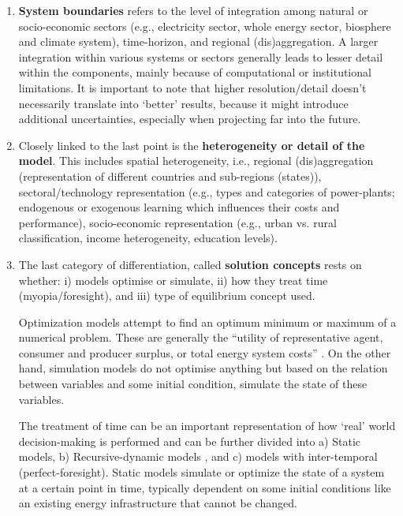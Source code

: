\documentclass[../thesis.tex]{subfiles}
\begin{document}
\begin{enumerate}
\item \textbf{System boundaries} refers to the level of integration among natural or socio-economic sectors (e.g., electricity sector, whole energy sector, biosphere and climate system), time-horizon, and regional (dis)aggregation. A larger integration within various systems or sectors generally leads to lesser detail within the components, mainly because of computational or institutional limitations. It is important to note that higher resolution/detail doesn't necessarily translate into `better' results, because it might introduce additional uncertainties, especially when projecting far into the future.
\item Closely linked to the last point is the \textbf{ heterogeneity or detail of the model}. This includes spatial heterogeneity, i.e., regional (dis)aggregation (representation of different countries and sub-regions (states)), sectoral/technology representation (e.g., types and categories of power-plants; endogenous or exogenous learning which influences their costs and performance), socio-economic representation (e.g., urban vs. rural classification, income heterogeneity, education levels). 
\item The last category of differentiation, called \textbf{solution concepts} rests on whether: i) models optimise or simulate, ii) how they treat time (myopia/foresight), and iii) type of equilibrium concept used. 

Optimization models attempt to find an optimum minimum or maximum of a numerical problem. These are generally the ``utility of representative agent, consumer and producer surplus, or total energy system costs'' \citep{krey2014}. On the other hand, simulation models do not optimise anything but based on the relation between variables and some initial condition, simulate the state of these variables.

The treatment of time can be an important representation of how `real' world decision-making is performed and can be further divided into a) Static models, b) Recursive-dynamic models , and c) models with inter-temporal (perfect-foresight). Static models simulate or optimize the state of a system at a certain point in time, typically dependent on some initial conditions like an existing energy infrastructure that cannot be changed.


\end{enumerate}
\end{document}
